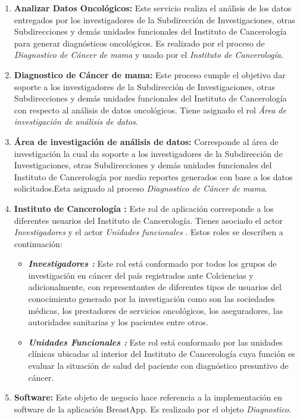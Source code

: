 \begin{enumerate}[label=\textbf{\arabic*})]
	
\item  \textbf{Analizar Datos Oncológicos:}  Este servicio realiza el análisis de los datos entregados por  los investigadores de la Subdirección de Investigaciones, otras Subdirecciones y demás unidades funcionales del Instituto de Cancerología para generar diagnósticos oncológicos. Es realizado por el proceso de \textit{Diagnostico de Cáncer de mama} y usado por el \textit{Instituto de Cancerología}.

\item  \textbf{Diagnostico de Cáncer de mama:}  Este proceso cumple el objetivo dar soporte a los investigadores de la Subdirección de Investigaciones, otras Subdirecciones y demás unidades funcionales del Instituto de Cancerología con respecto al análisis de datos oncológicos. Tiene asignado el rol \textit{Área de investigación de análisis de datos}.

\item  \textbf{Área de investigación de análisis de datos:}  Corresponde al área de investigación la cual da soporte a los investigadores de la Subdirección de Investigaciones, otras Subdirecciones y demás unidades funcionales del Instituto de Cancerología por medio reportes generados con base a los datos solicitados.Esta asignado al proceso \textit{Diagnostico de Cáncer de mama}.

\item  \textbf{Instituto de Cancerología :} Este rol de aplicación corresponde a los diferentes usuarios del Instituto de Cancerología. Tienes asociado el actor \textit{Investigadores} y el actor \textit{Unidades funcionales }. Estos roles se describen a continuación: 
\begin{itemize}
	\item  \textbf{\textit{Investigadores :}}  Este rol está conformado por todos los grupos de investigación en cáncer del país registrados ante Colciencias y adicionalmente, con representantes de diferentes tipos de usuarios del conocimiento generado por la investigación como son las sociedades médicas, los prestadores de servicios oncológicos, los aseguradores, las autoridades sanitarias y los pacientes entre otros. 
	
	\item  \textbf{\textit{Unidades Funcionales :}}  Este rol está conformado por las unidades clínicas ubicadas al interior del Instituto de Cancerología cuya función es evaluar la situación de salud del paciente con diagnóstico presuntivo de cáncer. 
\end{itemize}

\item  \textbf{Software:} Este objeto de negocio hace referencia a la implementación en software de la aplicación BreastApp. Es realizado por el objeto \textit{Diagnostico}.
\end{enumerate}

